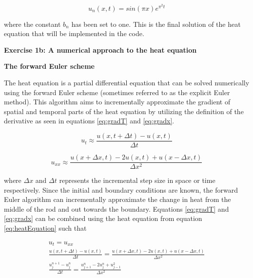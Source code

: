 \documentclass[12pt,a4paper]{article}
\begin{document}
\begin{equation}\label{eq:finalSol}
u_n(x,t) = sin(\pi x)e^{\pi^2 t}
\end{equation}

\noindent where the constant $b_n$ has been set to one. This is the final solution of the heat equation that will be implemented in the code.

\newpage

\begin{center}
\Large{\textbf{Exercise 1b: A numerical approach to the heat equation}}
\end{center}

\begin{center}
\large{\textbf{The forward Euler scheme}}
\end{center}

\noindent The heat equation is a partial differential equation that can be solved numerically using the forward Euler scheme (sometimes referred to as the explicit Euler method). This algorithm aims to incrementally approximate the gradient of spatial and temporal parts of the heat equation by utilizing the definition of the derivative as seen in equations \ref{eq:gradT} and \ref{eq:gradx}.

\begin{equation}\label{eq:gradT}
u_t \approx \frac{u(x, t+\Delta t) - u(x,t)}{\Delta t}
\end{equation}

\begin{equation}\label{eq:gradx}
u_{xx} \approx \frac{u(x + \Delta x, t) - 2u(x,t) + u(x-\Delta x,t)}{\Delta x^2}
\end{equation}

\noindent where $\Delta x$ and $\Delta t$ represents the incremental step size in space or time respectively. Since the initial and boundary conditions are known, the forward Euler algorithm can incrementally approximate the change in heat from the middle of the rod and out towards the boundary. Equations \ref{eq:gradT} and \ref{eq:gradx} can be combined using the heat equation from equation \ref{eq:heatEquation} such that

\begin{equation}\label{eq:forwardEuler1}
\begin{aligned}
u_t = u_{xx}
\\
\frac{u(x,t+\Delta t) - u(x,t)}{\Delta t} = \frac{u(x+\Delta x, t)-2u(x,t)+u(x-\Delta x,t)}{\Delta x^2}
\\
\frac{u_j^{n+1}-u_j^n}{\Delta t} = \frac{u_{j+1}^n - 2u_j^n + u_{j-1}^2}{\Delta x^2}
\end{aligned}
\end{equation}
\end{document}
